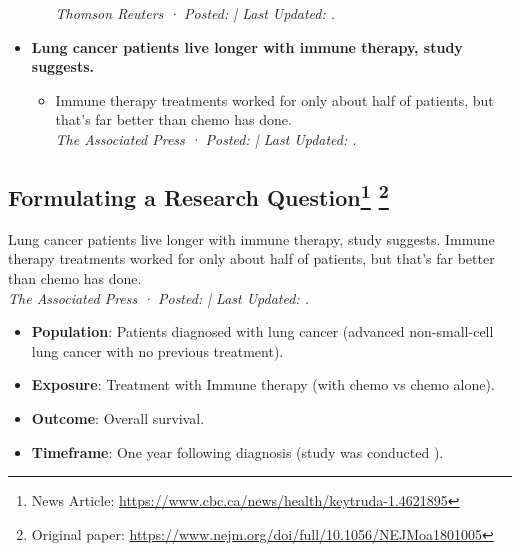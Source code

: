 \begin{itemize}
\begin{itemize}
                    \emph{Thomson Reuters · Posted:  | Last Updated: .}%
          \end{itemize}
    \item \textbf{Lung cancer patients live longer with immune therapy, study suggests.}
          \begin{itemize}
              \item Immune therapy treatments worked for only about half of patients, but that's far better than chemo has done.\\
                    \emph{The Associated Press · Posted:  | Last Updated: .}%
          \end{itemize}
\end{itemize}
\subsection*{Formulating a Research Question\footnote{News Article: \href{https://www.cbc.ca/news/health/keytruda-1.4621895}{https://www.cbc.ca/news/health/keytruda-1.4621895}}
    \footnote{Original paper: \href{https://www.nejm.org/doi/full/10.1056/NEJMoa1801005}{https://www.nejm.org/doi/full/10.1056/NEJMoa1801005}}}
\begin{paragraph}{Lung cancer patients live longer with immune therapy, study suggests.}
    Immune therapy treatments worked for only about half of patients, but that's far better than chemo has done.\\
    \emph{The Associated Press · Posted:  | Last Updated: .}%
\end{paragraph}
\begin{itemize}
    \item \textbf{Population}: Patients diagnosed with lung cancer (advanced non-small-cell lung cancer with no previous treatment).
    \item \textbf{Exposure}: Treatment with Immune therapy (with chemo vs chemo alone).
    \item \textbf{Outcome}: Overall survival.
    \item \textbf{Timeframe}: One year following diagnosis (study was conducted \printdayoff{}).%
\end{itemize}
